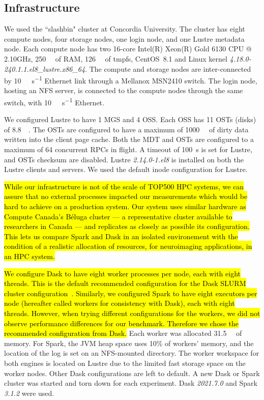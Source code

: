 \documentclass[AMA,STIX1COL]{WileyNJD-v2}
\newcommand{\HL}[1]{\hl{#1}}
\begin{document}
\subsection{Infrastructure}
We used the ``slashbin" cluster at Concordia University.
The cluster has eight compute nodes, four storage nodes, one login node, and one Lustre metadata node.
Each compute node has two 16-core Intel(R) Xeon(R) Gold 6130 CPU @ 2.10GHz,
\SI{250}{\gibi\byte} of RAM, \SI{126}{\gibi\byte} of tmpfs,
CentOS~8.1 and Linux kernel \textit{4.18.0-240.1.1.el8\_lustre.x86\_64}.
The compute and storage nodes are inter-connected by {\SI{10}{\giga\bit\per\second}} Ethernet link through a Mellanox MSN2410 switch.
The login node, hosting an NFS server, is connected to the compute nodes through the same switch, with {\SI{10}{\giga\bit\per\second}} Ethernet.
				
We configured Lustre to have 1 MGS and 4 OSS.
Each OSS has 11 OSTs (disks) of \SI{8.8}{\tebi\byte}.
The OSTs are configured to have a maximum of \SI{1000}{\mebi\byte} of dirty data written into the client page cache.
Both the MDT and OSTs are configured to a maximum of 64 concurrent RPCs in flight.
A timeout of \SI{100}{\second} is set for Lustre, and OSTs checksum are disabled.
Lustre \textit{2.14.0-1.el8} is installed on both the Lustre clients and servers.
We used the default inode configuration for Lustre.

\HL{
	While our infrastructure is not of the scale of TOP500 HPC systems,
	we can assure that no external processes
	impacted our measurements which would be hard to achieve on a production system.
	Our system uses similar hardware as Compute Canada's B\'eluga cluster
	--- a representative cluster available to researchers in Canada --- and 
	replicates as closely as possible its configuration.
	This lets us compare Spark and Dask in an isolated environement with the condition 
	of a realistic  allocation of resources, for neuroimaging applications, in an HPC system.
}
					
\HL{
	We configure Dask to have eight worker processes per node, each with eight threads.
	This is the default recommended configuration for the Dask SLURM cluster 
	configuration~{\cite{DaskSLURMDoc}}.
	Similarly, we configured Spark to have eight executors per node
	(hereafter called workers for consistency with Dask), each with eight threads.
	However, when trying different configurations for the workers, we did not
	observe performance differences for our benchmark.
	Therefore we chose the recommended configuration from Dask.
}
Each worker was allocated \SI{31.5}{\gibi\byte} of memory.
For Spark, the JVM heap space uses 10\% of workers' memory, and the location of the log is set on an NFS-mounted directory.
The worker workspace for both engines is located on Lustre due to the limited fast storage space on the worker nodes.
Other Dask configurations are left to default.
A new Dask or Spark cluster was started and torn down for each experiment.
Dask \textit{2021.7.0} and Spark \textit{3.1.2} were used.
						
\end{document}
